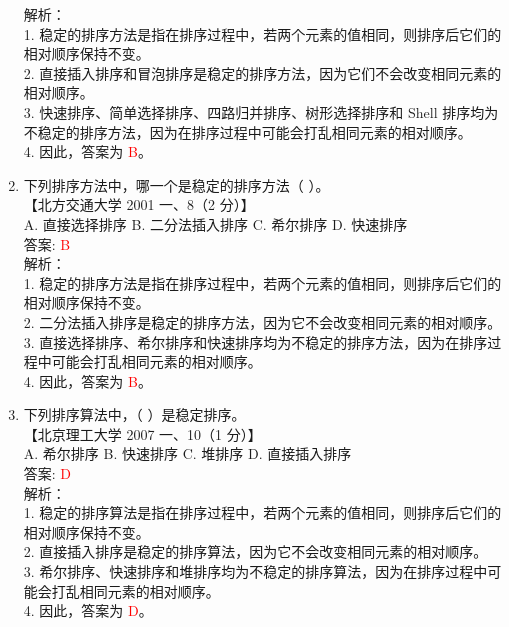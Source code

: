 \documentclass[lang=cn,newtx,10pt,scheme=chinese]{../../../elegantbook}
\begin{document}
\begin{enumerate}
    解析：\\
    1. 稳定的排序方法是指在排序过程中，若两个元素的值相同，则排序后它们的相对顺序保持不变。\\
    2. 直接插入排序和冒泡排序是稳定的排序方法，因为它们不会改变相同元素的相对顺序。\\
    3. 快速排序、简单选择排序、四路归并排序、树形选择排序和 Shell 排序均为不稳定的排序方法，因为在排序过程中可能会打乱相同元素的相对顺序。\\
    4. 因此，答案为 \textcolor{red}{B}。\\

    \item 下列排序方法中，哪一个是稳定的排序方法（ ）。\\
    【北方交通大学 2001 一、8（2 分）】\\

    A. 直接选择排序 \quad B. 二分法插入排序 \quad C. 希尔排序 \quad D. 快速排序 \\

    答案: \textcolor{red}{B} \\

    解析：\\
    1. 稳定的排序方法是指在排序过程中，若两个元素的值相同，则排序后它们的相对顺序保持不变。\\
    2. 二分法插入排序是稳定的排序方法，因为它不会改变相同元素的相对顺序。\\
    3. 直接选择排序、希尔排序和快速排序均为不稳定的排序方法，因为在排序过程中可能会打乱相同元素的相对顺序。\\
    4. 因此，答案为 \textcolor{red}{B}。\\
    \item 下列排序算法中，（ ）是稳定排序。\\
    【北京理工大学 2007 一、10（1 分）】\\

    A. 希尔排序 \quad B. 快速排序 \quad C. 堆排序 \quad D. 直接插入排序 \\

    答案: \textcolor{red}{D} \\

    解析：\\
    1. 稳定的排序算法是指在排序过程中，若两个元素的值相同，则排序后它们的相对顺序保持不变。\\
    2. 直接插入排序是稳定的排序算法，因为它不会改变相同元素的相对顺序。\\
    3. 希尔排序、快速排序和堆排序均为不稳定的排序算法，因为在排序过程中可能会打乱相同元素的相对顺序。\\
    4. 因此，答案为 \textcolor{red}{D}。\\ 


\end{enumerate}
\end{document}
